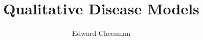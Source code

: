 \documentclass[a4paper]{article}
\begin{document}
	\title{Qualitative Disease Models}
	\author{Edward Cheesman}
	\date{}
	\maketitle
	
	
	
\end{document}
